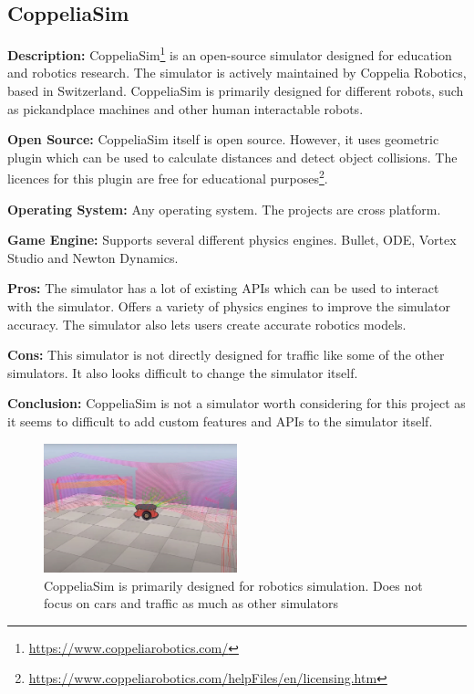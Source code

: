 \subsection{CoppeliaSim} \label{CoppeliaSim}
\textbf{Description:} CoppeliaSim\footnote{\url{https://www.coppeliarobotics.com/}} is an open-source simulator designed for education and robotics research. The simulator is actively maintained by Coppelia Robotics, based in Switzerland. CoppeliaSim is primarily designed for different robots, such as pick\-and\-place machines and other human interactable robots. 

\textbf{Open Source:} CoppeliaSim itself is open source. However, it uses geometric plugin which can be used to calculate distances and detect object collisions. The licences for this plugin are free for educational purposes\footnote{\url{https://www.coppeliarobotics.com/helpFiles/en/licensing.htm}}. 

\textbf{Operating System:} Any operating system. The projects are cross platform. 

\textbf{Game Engine:} Supports several different physics engines. Bullet, ODE, Vortex Studio and Newton Dynamics. 

\textbf{Pros:} The simulator has a lot of existing APIs which can be used to interact with the simulator. Offers a variety of physics engines to improve the simulator accuracy. The simulator also lets users create accurate robotics models. 

\textbf{Cons:} This simulator is not directly designed for traffic like some of the other simulators. It also looks difficult to change the simulator itself.

\textbf{Conclusion:} CoppeliaSim is not a simulator worth considering for this project as it seems to difficult to add custom features and APIs to the simulator itself. 


\begin{figure}[H]
    \centering
    \includegraphics[width=0.5\textwidth]{03_Background/Appendix/Simulators/CoppeliaSim.JPG}
    \caption{CoppeliaSim is primarily designed for robotics simulation. Does not focus on cars and traffic as much as other simulators}
\end{figure}



